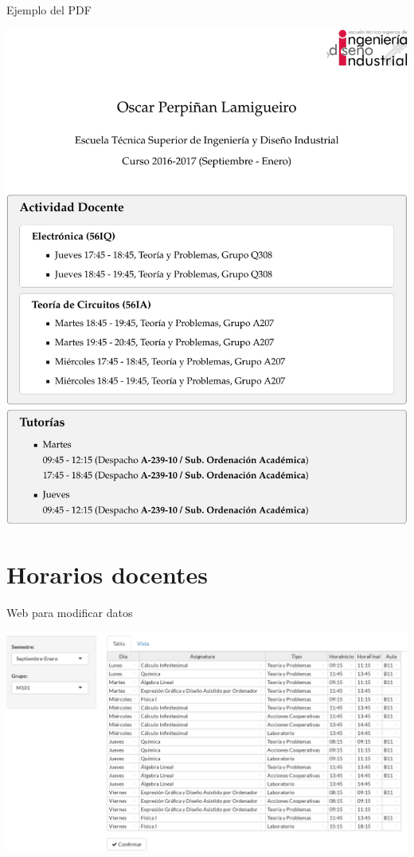 \documentclass[spanish, xcolor={usenames,svgnames,dvipsnames}]{beamer}
\begin{document}
\begin{frame}[label={sec:orgad5d658}]{Ejemplo del PDF}
\begin{center}
\includegraphics[width=.9\linewidth]{images/tutorias_OPL.pdf}
\end{center}
\end{frame}


\section{Horarios docentes}
\label{sec:org478d22f}

\begin{frame}[label={sec:org242b854}]{Web para modificar datos}
\begin{block}{}
\begin{center}
\includegraphics[width=.9\linewidth]{images/horarios.png}
\end{center}
\end{block}
\end{frame}
\end{document}
